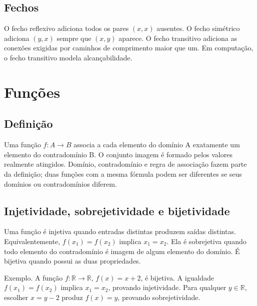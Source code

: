 \documentclass[12pt,a4paper,openany]{book}
\begin{document}
\section{Fechos}



O fecho reflexivo adiciona todos os pares $(x,x)$ ausentes. O fecho simétrico adiciona $(y,x)$ sempre que $(x,y)$ aparece. O fecho transitivo adiciona as conexões exigidas por caminhos de comprimento maior que um. Em computação, o fecho transitivo modela alcançabilidade.



\chapter{Funções}



\section{Definição}



Uma função $f:A\to B$ associa a cada elemento do domínio A exatamente um elemento do contradomínio B. O conjunto imagem é formado pelos valores realmente atingidos. Domínio, contradomínio e regra de associação fazem parte da definição; duas funções com a mesma fórmula podem ser diferentes se seus domínios ou contradomínios diferem.



\section{Injetividade, sobrejetividade e bijetividade}



Uma função é injetiva quando entradas distintas produzem saídas distintas. Equivalentemente, $f(x_1)=f(x_2)$ implica $x_1=x_2$. Ela é sobrejetiva quando todo elemento do contradomínio é imagem de algum elemento do domínio. É bijetiva quando possui as duas propriedades.



\begin{exemplo}{Exemplo.}
A função $f:\mathbb{R}\to\mathbb{R}$, $f(x)=x+2$, é bijetiva. A igualdade $f(x_1)=f(x_2)$ implica $x_1=x_2$, provando injetividade. Para qualquer $y\in\mathbb{R}$, escolher $x=y-2$ produz $f(x)=y$, provando sobrejetividade.
\end{exemplo}
\end{document}
